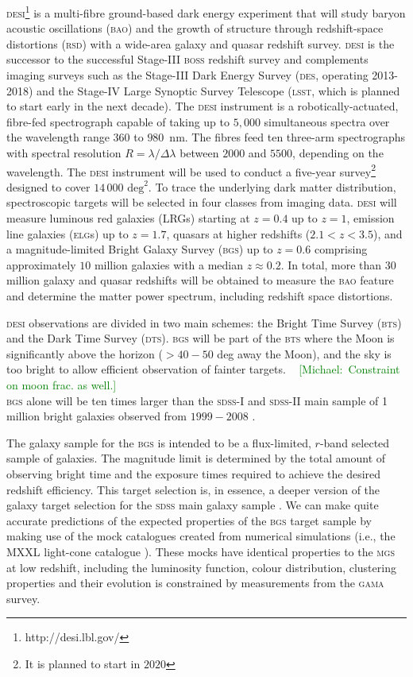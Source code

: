 \documentclass[fleqn,usenatbib]{mnras}
\newcommand{\mike}[1]{~\newline\noindent \textcolor{Green}{{ [Michael:~{#1}]\\}}}
\newcommand{\BAO}{\textsc{bao}\xspace}
\newcommand{\BGS}{\textsc{bgs}\xspace}
\newcommand{\BOSS}{\textsc{boss}\xspace}
\newcommand{\BTS}{\textsc{bts}\xspace}
\newcommand{\DESI}{\textsc{desi}\xspace}
\newcommand{\DES}{\textsc{des}\xspace}
\newcommand{\DTS}{\textsc{dts}\xspace}
\newcommand{\ELGs}{\textsc{elg}s\xspace}
\newcommand{\GAMA}{\textsc{gama}\xspace}
\newcommand{\LSST}{\textsc{lsst}\xspace}
\newcommand{\MGS}{\textsc{mgs}\xspace}
\newcommand{\RSD}{\textsc{rsd}\xspace}
\newcommand{\SDSS}{\textsc{sdss}\xspace}
\begin{document}
\DESI \citep{Aghamousa:2016zmz}\footnote{http://desi.lbl.gov/} is a multi-fibre ground-based dark energy experiment that will study baryon acoustic oscillations (\BAO) and the growth of structure through redshift-space distortions (\RSD) with a wide-area galaxy and quasar redshift survey. \DESI is the successor to the successful Stage-III \BOSS redshift
survey \citep{doi:10.1093/mnras/sts314} and complements imaging surveys such as the Stage-III Dark Energy Survey \citep{Crocce:2017iwq} (\DES, operating 2013-2018) and the Stage-IV Large Synoptic Survey Telescope (\LSST, which is planned to start early in the next decade). The \DESI instrument is a robotically-actuated, fibre-fed spectrograph capable of taking up
to $5,000$ simultaneous spectra over the wavelength range $360$ to $980$~nm. The fibres feed ten three-arm spectrographs with spectral resolution $R = \lambda/\Delta\lambda$ between $2000$ and $5500$, depending on the
wavelength. The \DESI instrument will be used to conduct a five-year survey\footnote{It is planned to start in $2020$} designed to cover $14\,000$ $\textrm{deg}^2$. To trace the underlying dark matter distribution, spectroscopic targets will be selected in four classes from imaging data. \DESI will measure luminous red galaxies (LRGs) starting at $z = 0.4$ up to $z = 1$, emission line galaxies (\ELGs) up to $z = 1.7$, quasars at higher redshifts ($2.1 < z < 3.5$), and a magnitude-limited Bright Galaxy Survey (\BGS) up to $z = 0.6$ comprising approximately $10$ million galaxies with a median $z \approx 0.2$. 
In total, more than 30 million galaxy and quasar redshifts will be obtained to measure the \BAO feature and determine the matter power spectrum, including redshift space distortions.

\DESI observations are divided in two main schemes: the Bright Time Survey (\BTS) and the Dark Time Survey (\DTS). \BGS will be part of the \BTS where the Moon is significantly above the horizon ($> 40 - 50$ deg away the Moon), and the sky is too bright to allow efficient observation of fainter targets.  
\mike{Constraint on moon frac. as well.}
\BGS alone will be ten times larger than the \SDSS-I and \SDSS-II main sample of 1 million bright galaxies observed from $1999-2008$ \citep{Abazajian:2003jy}.

The galaxy sample for the \BGS is intended to be a flux-limited, $r$-band selected sample of galaxies. The magnitude limit is determined by the total amount of observing bright time and the exposure times required to achieve the desired redshift efficiency. This target selection is, in essence, a deeper version of the galaxy target selection for the \SDSS main galaxy sample \cite[\MGS,][]{2002AJ....124.1810S}. We can make quite accurate 
predictions of 
the expected properties of the \BGS target sample by making use of the mock catalogues created from numerical simulations (i.e., the MXXL light-cone catalogue \citep{Smith:2017tzz}). These mocks have identical properties to the \MGS at low redshift, including the luminosity function,
colour distribution, clustering properties and their evolution is constrained by measurements from the \GAMA survey.
\end{document}
